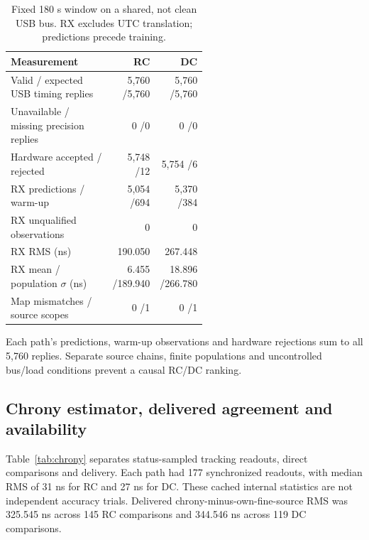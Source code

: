 \documentclass[11pt,letterpaper]{article}
\begin{document}
\begin{table}[htbp]\centering\small
\caption{Fixed 180 s window on a shared, not clean USB bus. RX excludes UTC translation; predictions precede training.}\label{tab:usb}
\begin{tabular}{L{0.55\linewidth}rr}\toprule Measurement & RC & DC\\\midrule
Valid / expected USB timing replies &5,760 /5,760 &5,760 /5,760\\
Unavailable / missing precision replies &0 /0 &0 /0\\
Hardware accepted / rejected &5,748 /12 &5,754 /6\\
RX predictions / warm-up &5,054 /694 &5,370 /384\\
RX unqualified observations &0 &0\\
RX RMS (ns) &190.050 &267.448\\
RX mean / population $\sigma$ (ns) &6.455 /189.940 &18.896 /266.780\\
Map mismatches / source scopes &0 /1 &0 /1\\\bottomrule
\end{tabular}\end{table}

Each path's predictions, warm-up observations and hardware rejections sum to all 5,760 replies. Separate source chains, finite populations and uncontrolled bus/load conditions prevent a causal RC/DC ranking.

\subsection{Chrony estimator, delivered agreement and availability}
Table~\ref{tab:chrony} separates status-sampled tracking readouts, direct comparisons and delivery. Each path had 177 synchronized readouts, with median RMS of 31 ns for RC and 27 ns for DC. These cached internal statistics are not independent accuracy trials. Delivered chrony-minus-own-fine-source RMS was 325.545 ns across 145 RC comparisons and 344.546 ns across 119 DC comparisons.
\end{document}
